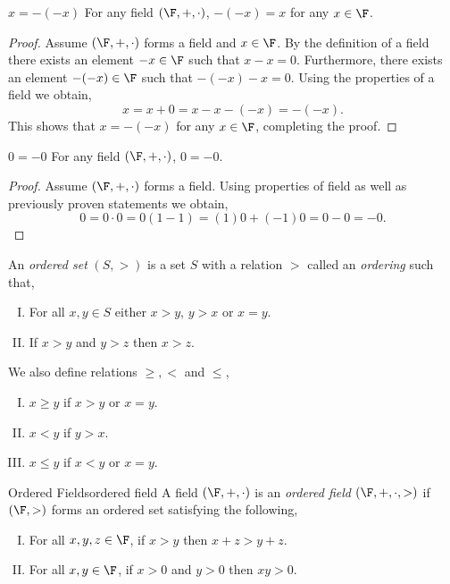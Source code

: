 \documentclass{report}
\begin{document}
\begin{lemma}{$x = -(-x)$}{}
  For any field $\left(\F, +, \cdot\right)$, $-(-x) = x$ for any $x \in \F$.
\end{lemma}

\begin{proof}
  Assume $\left(\F, +, \cdot\right)$ forms a field and $x \in \F$.
  By the definition of a field there exists an element $-x \in \F$ such that $x - x = 0$.
  Furthermore, there exists an element $-(-x) \in \F$ such that $-(-x) - x = 0$.
  Using the properties of a field we obtain,
  $$x = x + 0 = x - x -(-x) = -(-x).$$
  This shows that $x = -(-x)$ for any $x \in \F$, completing the proof.
\end{proof}

\begin{lemma}{$0 = -0$}{}
  For any field $\left(\F, +, \cdot\right)$, $0 = -0$.
\end{lemma}

\begin{proof}
  Assume $\left(\F, +, \cdot\right)$ forms a field.
  Using properties of field as well as previously proven statements we obtain,
  $$0 = 0 \cdot 0 = 0(1 - 1) = (1)0 + (-1)0 = 0 - 0 = -0.$$
\end{proof}

\begin{definition}{}{}
  An \emph{ordered set} $\left(S, >\right)$ is a set $S$ with a relation $>$ called an \emph{ordering} such that,
  \begin{enumerate}[I.]
    \item For all $x, y \in S$ either $x > y$, $y > x$ or $x = y$.
    \item If $x > y$ and $y > z$ then $x > z$.
  \end{enumerate}
  We also define relations $\geq, <$ and $\leq$,
  \begin{enumerate}[I.]
    \item $x \geq y$ if $x > y$ or $x = y$.
    \item $x < y$ if $y > x$.
    \item $x \leq y$ if $x < y$ or $x = y$.
  \end{enumerate}
\end{definition}

\begin{definition}{Ordered Fields}{ordered field}
  A field $\left(\F, +, \cdot\right)$ is an \emph{ordered field} $\left(\F, +, \cdot, > \right)$ if $\left(\F, >\right)$ forms an ordered set satisfying the following,
  \begin{enumerate}[I.]
    \item For all $x,y,z \in \F$, if $x > y$ then $x + z > y + z$.
    \item For all $x,y \in \F$, if $x > 0$ and $y > 0$ then $xy > 0$.
  \end{enumerate}
\end{definition}
\end{document}
